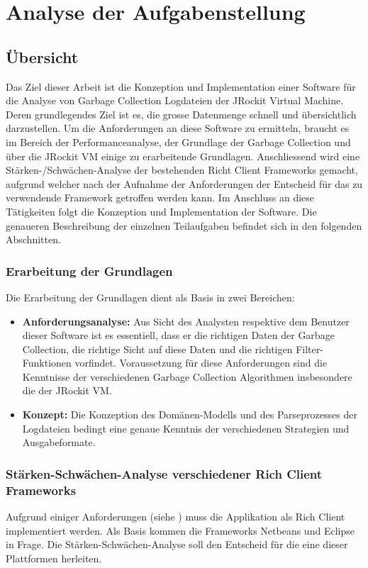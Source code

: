 \chapter{Analyse der Aufgabenstellung}\label{analyse_aufgabenstellung}
\section{Übersicht}
Das Ziel dieser Arbeit ist die Konzeption und Implementation einer Software für die Analyse von Garbage Collection Logdateien der JRockit Virtual Machine. Deren grundlegendes Ziel ist es, die grosse Datenmenge schnell und übersichtlich darzustellen. Um die Anforderungen an diese Software zu ermitteln, braucht es im Bereich der Performanceanalyse, der Grundlage der Garbage Collection und über die JRockit VM einige zu erarbeitende Grundlagen. Anschliessend wird eine Stärken-/Schwächen-Analyse der bestehenden Richt Client Frameworks gemacht, aufgrund welcher nach der Aufnahme der Anforderungen der Entscheid für das zu verwendende Framework getroffen werden kann. Im Anschluss an diese Tätigkeiten folgt die Konzeption und Implementation der Software. Die genaueren Beschreibung der einzelnen Teilaufgaben befindet sich in den folgenden Abschnitten.

\subsection{Erarbeitung der Grundlagen}
Die Erarbeitung der Grundlagen dient als Basis in zwei Bereichen:
\begin{itemize}
	\item \textbf{Anforderungsanalyse:} Aus Sicht des Analysten respektive dem Benutzer dieser Software ist es essentiell, dass er die richtigen Daten der Garbage Collection, die richtige Sicht auf diese Daten und die richtigen Filter-Funktionen vorfindet. Voraussetzung für diese Anforderungen sind die Kenntnisse der verschiedenen Garbage Collection Algorithmen insbesondere die der JRockit VM. 
	\item \textbf{Konzept: } Die Konzeption des Domänen-Modells und des Parseprozesses der Logdateien bedingt eine genaue Kenntnis der verschiedenen Strategien und Ausgabeformate.
\end{itemize}

\subsection{Stärken-Schwächen-Analyse verschiedener Rich Client Frameworks}
Aufgrund einiger Anforderungen (siehe ) muss die Applikation als Rich Client implementiert werden. Als Basis kommen die Frameworks Netbeans und Eclipse in Frage. Die Stärken-Schwächen-Analyse soll den Entscheid für die eine dieser Plattformen herleiten.

